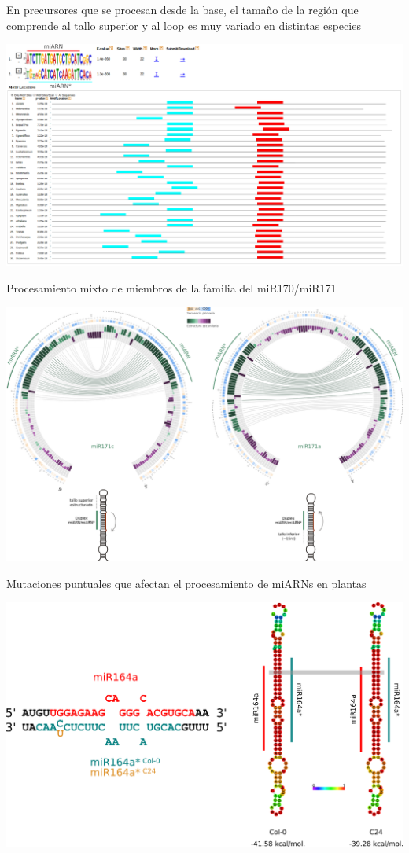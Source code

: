 \documentclass{beamer}
\begin{document}
\begin{frame}{En precursores que se procesan desde la base, el tamaño de la región que comprende al tallo superior y al loop es muy variado en distintas especies}
	\begin{center}
		\includegraphics[width=1\textwidth]{img/miR172_meme.png}
	\end{center}
\end{frame}

\begin{frame}{Procesamiento mixto de miembros de la familia del miR170/miR171}
	\begin{center}
		\includegraphics[width=1\textwidth]{img/familia_miR171_circos.png}
	\end{center}
\end{frame}

\begin{frame}{Mutaciones puntuales que afectan el procesamiento de miARNs en plantas}
	\begin{center}
		\includegraphics[width=.7\textwidth]{img/miR164_ss_bp.png}
	\end{center}
\end{frame}
\end{document}
